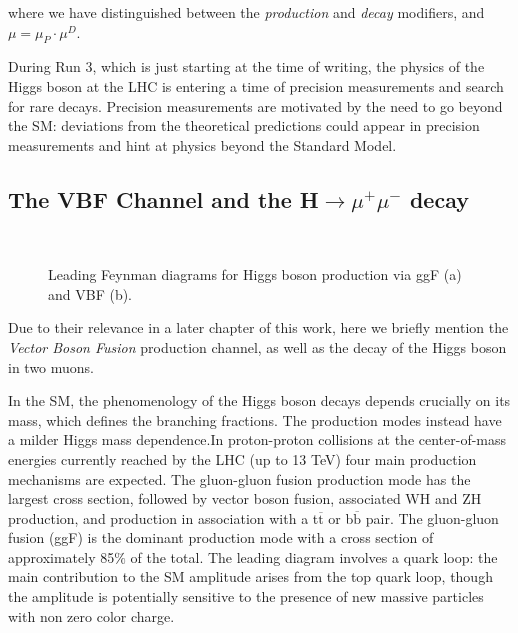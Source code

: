 where we have distinguished between the \emph{production} and \emph{decay} modifiers, and $\mu = \mu_P \cdot \mu^D$.

During Run 3, which is just starting at the time of writing, the
physics of the Higgs boson at the LHC is entering a time of precision measurements and
search for rare decays. Precision measurements are motivated by the need to go beyond the SM: deviations from the theoretical predictions could appear in precision measurements and hint at physics beyond the Standard Model.

\subsection{The VBF Channel and the H$\rightarrow\mu^+\mu^-$ decay}

\begin{figure}
    \myfloatalign
     \quad
     \\
    \caption[ggF and VBF]{Leading Feynman diagrams for Higgs boson production via ggF (a) and VBF (b).}\label{fig:feypro}
\end{figure}

Due to their relevance in a later chapter of this work, here we briefly mention the \emph{Vector Boson Fusion} production channel, as well as the decay of the Higgs boson in two muons.

In the SM, the phenomenology of the Higgs boson decays depends crucially on its mass,
which defines the branching fractions. The production modes instead have a milder Higgs
mass dependence.In proton-proton collisions at the center-of-mass energies currently reached by the LHC
(up to 13 TeV) four main production mechanisms are expected. The gluon-gluon fusion
production mode has the largest cross section, followed by vector boson fusion, associated
WH and ZH production, and production in association with a t$\overline{\text{t}}$  or b$\overline{\text{b}}$ pair. The gluon-gluon fusion (ggF) is the dominant production mode with a cross section of
approximately 85$\%$ of the total. The leading diagram involves a quark loop: the main
contribution to the SM amplitude arises from the top quark loop, though the amplitude is
potentially sensitive to the presence of new massive particles with non zero color charge.

